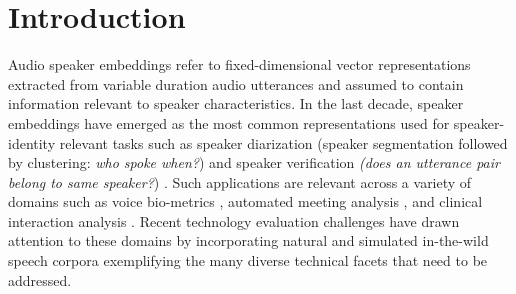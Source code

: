 \section{Introduction}
\label{sec:intro}


Audio speaker embeddings refer to fixed-dimensional vector representations extracted from variable duration audio utterances and assumed to contain information relevant to speaker characteristics. In the last decade, speaker embeddings have emerged as the most common representations used for speaker-identity relevant tasks such as speaker diarization (speaker segmentation followed by clustering: \textit{who spoke when?}) \cite{anguera_DiarOverview2012} and speaker verification \textit{(does an utterance pair belong to same speaker?}) \cite{campbell_speakerRecogTutorial1997}.
Such applications are relevant across a variety of domains such as 
voice bio-metrics \cite{rahulamathavan_bioMetrics2019, scheffer_bioMetrics2013}, automated meeting analysis \cite{anguera2007acoustic,vanLeeuwen_meeting2006}, and clinical interaction analysis \cite{pal_clusterGAN2020, xiao2016technology}. Recent technology evaluation challenges \cite{ryant2019second, richey2018voices, Hansen_fearlessSteps2018, McLaren_SITW2016} have drawn attention to these domains by incorporating natural and simulated in-the-wild speech corpora exemplifying the many diverse technical facets that need to be addressed. 

